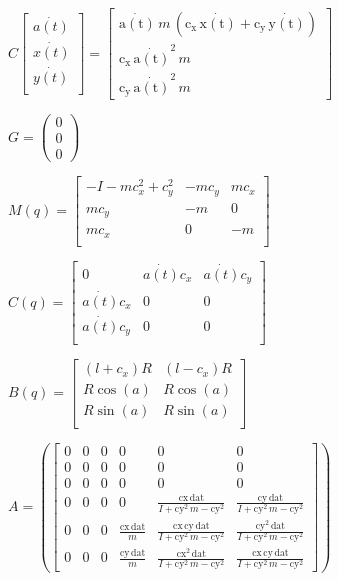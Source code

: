\documentclass[fleqn, a4paper, 12pt, russian]{article}
\begin{document}
\begin{landscape}
$C\begin{bmatrix}
\dot{a(t)}\\
\dot{x(t)}\\
\dot{y(t)}\\
\end{bmatrix} = \begin{bmatrix} \mathrm{\dot{a(t)}}\,m\,(\mathrm{c_x}\,\mathrm{\dot{x(t)}}+\mathrm{c_y}\,\mathrm{\dot{y(t)}})\\ \mathrm{c_x}\,{\mathrm{\dot{a(t)}}}^2\,m\\ \mathrm{c_y}\,{\mathrm{\dot{a(t)}}}^2\,m \end{bmatrix}$

$G=(\begin{array}{c} 0\\ 0\\ 0 \end{array})$


$M(q) = \begin{bmatrix}
	-I-mc_x^2+c_y^2&-mc_y&mc_x\\
	mc_y&-m&0\\
	mc_x&0&-m\\
\end{bmatrix}$

$C(q)=\begin{bmatrix}
	0&\dot{a(t)}c_x&\dot{a(t)}c_y\\	
	\dot{a(t)}c_x&0&0\\
	\dot{a(t)}c_y&0&0\\
\end{bmatrix}$

$B(q) = \begin{bmatrix}
    (l+c_x)R&	(l-c_x)R\\
	R\cos(a)&	R\cos(a)\\
	R\sin(a)&	R\sin(a)\\
\end{bmatrix}$

$A = (\begin{bmatrix} 0 & 0 & 0 & 0 & 0 & 0\\ 0 & 0 & 0 & 0 & 0 & 0\\ 0 & 0 & 0 & 0 & 0 & 0\\ 0 & 0 & 0 & 0 & \frac{\mathrm{cx}\,\mathrm{dat}}{I+{\mathrm{cy}}^2\,m-{\mathrm{cy}}^2} & \frac{\mathrm{cy}\,\mathrm{dat}}{I+{\mathrm{cy}}^2\,m-{\mathrm{cy}}^2}\\ 0 & 0 & 0 & \frac{\mathrm{cx}\,\mathrm{dat}}{m} & \frac{\mathrm{cx}\,\mathrm{cy}\,\mathrm{dat}}{I+{\mathrm{cy}}^2\,m-{\mathrm{cy}}^2} & \frac{{\mathrm{cy}}^2\,\mathrm{dat}}{I+{\mathrm{cy}}^2\,m-{\mathrm{cy}}^2}\\ 0 & 0 & 0 & \frac{\mathrm{cy}\,\mathrm{dat}}{m} & \frac{{\mathrm{cx}}^2\,\mathrm{dat}}{I+{\mathrm{cy}}^2\,m-{\mathrm{cy}}^2} & \frac{\mathrm{cx}\,\mathrm{cy}\,\mathrm{dat}}{I+{\mathrm{cy}}^2\,m-{\mathrm{cy}}^2} \end{bmatrix})$




\end{landscape}
\end{document}
